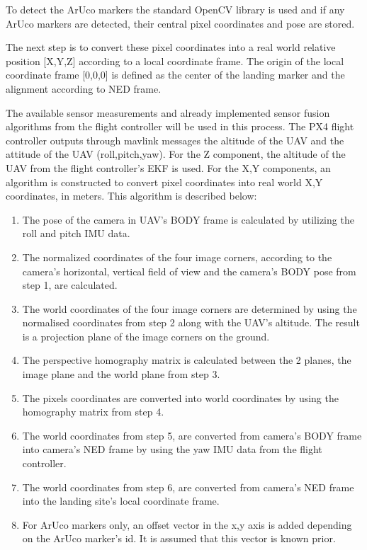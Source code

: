 \documentclass[conference]{IEEEtran}
\begin{document}
To detect the ArUco markers the standard OpenCV library is used and if any ArUco markers are detected, their central pixel coordinates and pose are stored.

The next step is to convert these pixel coordinates into a real world relative position [X,Y,Z] according to a local coordinate frame. The origin of the local coordinate frame [0,0,0] is defined as the center of the landing marker and the alignment according to NED frame. 

The available sensor measurements and already implemented sensor fusion algorithms from the flight controller will be used in this process. The PX4 flight controller outputs through mavlink messages the altitude of the UAV and the attitude of the UAV (roll,pitch,yaw). For the Z component, the altitude of the UAV from the flight controller's EKF is used. For the X,Y components, an algorithm is constructed to convert pixel coordinates into real world X,Y coordinates, in meters. This algorithm is described below:

\begin{enumerate}

\item The pose of the camera in UAV's BODY frame is calculated by utilizing the roll and pitch IMU data.

\item The normalized coordinates of the four image corners, according to the camera's horizontal, vertical field of view and the camera's BODY pose from step 1, are calculated.

\item The world coordinates of the four image corners are determined by using the normalised coordinates from step 2 along with the UAV's altitude. The result is a projection plane of the image corners on the ground.

\item The perspective homography matrix is calculated between the 2 planes, the image plane and the world plane from step 3.

\item The pixels coordinates are converted into world coordinates by using the homography matrix from step 4.

\item The world coordinates from step 5, are converted from camera's BODY frame into camera's NED frame by using the yaw IMU data from the flight controller.

\item The world coordinates from step 6, are converted from camera's NED frame into the landing site's local coordinate frame.

\item For ArUco markers only, an offset vector in the x,y axis is added depending on the ArUco marker's id. It is assumed that this vector is known prior.


\end{enumerate}
\end{document}
